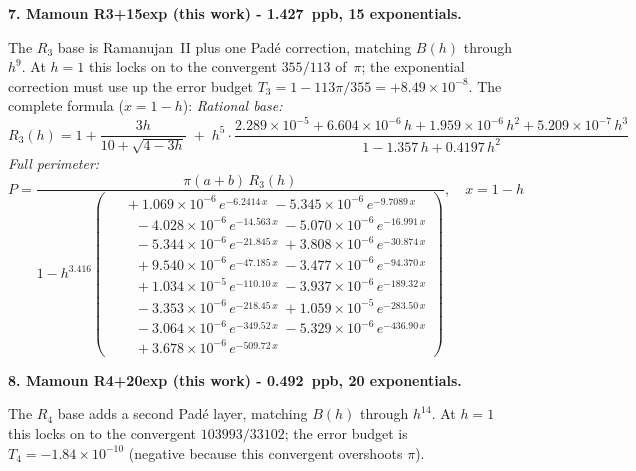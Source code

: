 \documentclass[12pt]{article}
\begin{document}
\bigskip

\noindent\textbf{7. Mamoun R3+15exp (this work) - 1.427~ppb, 15 exponentials.}

\smallskip\noindent The $R_3$ base is Ramanujan~II plus one Pad\'e correction, matching $B(h)$ through $h^9$.  At $h=1$ this locks on to the convergent $355/113$ of~$\pi$; the exponential correction must use up the error budget $T_3 = 1 - 113\pi/355 = +8.49 \times 10^{-8}$.  The complete formula ($x = 1-h$):
\noindent\emph{Rational base:}
\[
R_3(h) = 1 + \frac{3h}{10+\sqrt{4{-}3h}}
  \;+\; h^5\!\cdot\!\frac{2.289{\times}10^{-5} + 6.604{\times}10^{-6}\,h + 1.959{\times}10^{-6}\,h^2 + 5.209{\times}10^{-7}\,h^3}
       {1 - 1.357\,h + 0.4197\,h^2}
\]
\emph{Full perimeter:}
\begin{equation*}
P = \frac{\pi(a{+}b)\,R_3(h)}{1 - h^{3.416}\!\left(\!\begin{aligned}
  &\; +1.069{\times}10^{-6}\,e^{-6.2414\,x} \; -5.345{\times}10^{-6}\,e^{-9.7089\,x} \\[-3pt]
  &\quad -4.028{\times}10^{-6}\,e^{-14.563\,x} \; -5.070{\times}10^{-6}\,e^{-16.991\,x} \\[-3pt]
  &\quad -5.344{\times}10^{-6}\,e^{-21.845\,x} \; +3.808{\times}10^{-6}\,e^{-30.874\,x} \\[-3pt]
  &\quad +9.540{\times}10^{-6}\,e^{-47.185\,x} \; -3.477{\times}10^{-6}\,e^{-94.370\,x} \\[-3pt]
  &\quad +1.034{\times}10^{-5}\,e^{-110.10\,x} \; -3.937{\times}10^{-6}\,e^{-189.32\,x} \\[-3pt]
  &\quad -3.353{\times}10^{-6}\,e^{-218.45\,x} \; +1.059{\times}10^{-5}\,e^{-283.50\,x} \\[-3pt]
  &\quad -3.064{\times}10^{-6}\,e^{-349.52\,x} \; -5.329{\times}10^{-6}\,e^{-436.90\,x} \\[-3pt]
  &\quad +3.678{\times}10^{-6}\,e^{-509.72\,x}
\end{aligned}\!\right)}, \quad x = 1{-}h
\end{equation*}

\bigskip

\noindent\textbf{8. Mamoun R4+20exp (this work) - 0.492~ppb, 20 exponentials.}

\smallskip\noindent The $R_4$ base adds a second Pad\'e layer, matching $B(h)$ through $h^{14}$.  At $h=1$ this locks on to the convergent $103993/33102$; the error budget is $T_4 = -1.84 \times 10^{-10}$ (negative because this convergent overshoots $\pi$).
\end{document}
